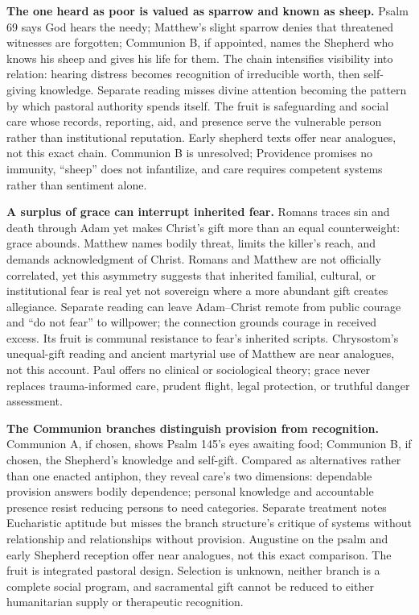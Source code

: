 \noindent\textbf{The one heard as poor is valued as sparrow and known as sheep.\enspace{}}
Psalm 69 says God hears the needy; Matthew's slight sparrow denies that threatened witnesses are forgotten; Communion B, if appointed, names the Shepherd who knows his sheep and gives his life for them. The chain intensifies visibility into relation: hearing distress becomes recognition of irreducible worth, then self-giving knowledge. Separate reading misses divine attention becoming the pattern by which pastoral authority spends itself. The fruit is safeguarding and social care whose records, reporting, aid, and presence serve the vulnerable person rather than institutional reputation. Early shepherd texts offer near analogues, not this exact chain. Communion B is unresolved; Providence promises no immunity, “sheep” does not infantilize, and care requires competent systems rather than sentiment alone.

\noindent\textbf{A surplus of grace can interrupt inherited fear.\enspace{}}
Romans traces sin and death through Adam yet makes Christ's gift more than an equal counterweight: grace abounds. Matthew names bodily threat, limits the killer's reach, and demands acknowledgment of Christ. Romans and Matthew are not officially correlated, yet this asymmetry suggests that inherited familial, cultural, or institutional fear is real yet not sovereign where a more abundant gift creates allegiance. Separate reading can leave Adam--Christ remote from public courage and “do not fear” to willpower; the connection grounds courage in received excess. Its fruit is communal resistance to fear's inherited scripts. Chrysostom's unequal-gift reading and ancient martyrial use of Matthew are near analogues, not this account. Paul offers no clinical or sociological theory; grace never replaces trauma-informed care, prudent flight, legal protection, or truthful danger assessment.

\noindent\textbf{The Communion branches distinguish provision from recognition.\enspace{}}
Communion A, if chosen, shows Psalm 145's eyes awaiting food; Communion B, if chosen, the Shepherd's knowledge and self-gift. Compared as alternatives rather than one enacted antiphon, they reveal care's two dimensions: dependable provision answers bodily dependence; personal knowledge and accountable presence resist reducing persons to need categories. Separate treatment notes Eucharistic aptitude but misses the branch structure's critique of systems without relationship and relationships without provision. Augustine on the psalm and early Shepherd reception offer near analogues, not this exact comparison. The fruit is integrated pastoral design. Selection is unknown, neither branch is a complete social program, and sacramental gift cannot be reduced to either humanitarian supply or therapeutic recognition.
